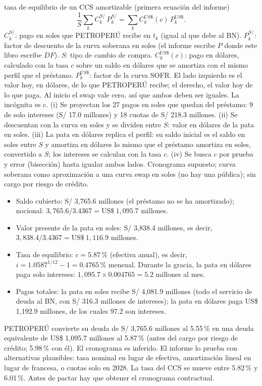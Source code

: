 \begin{ficha}{tasa de equilibrio de un CCS amortizable (primera ecuación del informe)}
\[ \frac{1}{S}\sum_{k}C^{S/}_k\,P^{S/}_k=\sum_k C^{US\$}_k(c)\,P^{US\$}_k. \]
 $C^{S/}_k$: pago en soles que PETROPERÚ recibe en $t_k$ (igual al que debe al BN). $P^{S/}_k$: factor de descuento de la curva soberana en soles (el informe escribe $P$ donde este libro escribe $DF$). $S$: tipo de cambio de compra. $C^{US\$}_k(c)$: pago en dólares, calculado con la tasa $c$ sobre un saldo en dólares que se amortiza con el mismo perfil que el préstamo. $P^{US\$}_k$: factor de la curva SOFR.
 El lado izquierdo es el valor hoy, en dólares, de lo que PETROPERÚ recibe; el derecho, el valor hoy de lo que paga. Al inicio el swap vale cero, así que ambos deben ser iguales. La incógnita es $c$.
 (i) Se proyectan los 27 pagos en soles que quedan del préstamo: 9 de solo intereses (S/ 17.0 millones) y 18 cuotas de S/ 218.3 millones. (ii) Se descuentan con la curva en soles y se dividen entre $S$: valor en dólares de la pata en soles. (iii) La pata en dólares replica el perfil: su saldo inicial es el saldo en soles entre $S$ y amortiza en dólares lo mismo que el préstamo amortiza en soles, convertido a $S$; los intereses se calculan con la tasa $c$. (iv) Se busca $c$ por prueba y error (bisección) hasta igualar ambos lados.
 Cronograma supuesto; curva soberana como aproximación a una curva swap en soles (no hay una pública); sin cargo por riesgo de crédito.
\begin{itemize}
\item Saldo cubierto: S/ 3,765.6 millones (el préstamo no se ha amortizado); nocional: $3{,}765.6/3.4367=\text{US\$}~1{,}095.7$ millones.
\item Valor presente de la pata en soles: S/ 3,838.4 millones, es decir, $3{,}838.4/3.4367=\text{US\$}~1{,}116.9$ millones.
\item Tasa de equilibrio: $c=5.87\,\%$ (efectiva anual), es decir, $i=1.0587^{1/12}-1=0.4765\,\%$ mensual. Durante la gracia, la pata en dólares paga solo intereses: $1{,}095.7\times0.004765=5.2$ millones al mes.
\item Pagos totales: la pata en soles recibe S/ 4,081.9 millones (todo el servicio de deuda al BN, con S/ 316.3 millones de intereses); la pata en dólares paga US\$ 1,192.9 millones, de los cuales 97.2 son intereses.
\end{itemize}
 PETROPERÚ convierte su deuda de S/ 3,765.6 millones al 5.55\,\% en una deuda equivalente de US\$ 1,095.7 millones al 5.87\,\% (antes del cargo por riesgo de crédito; 5.98\,\% con él).
 El cronograma es inferido. El informe lo prueba con alternativas plausibles: tasa nominal en lugar de efectiva, amortización lineal en lugar de francesa, o cuotas solo en 2028. La tasa del CCS se mueve entre 5.82\,\% y 6.01\,\%. Antes de pactar hay que obtener el cronograma contractual.
\end{ficha}

